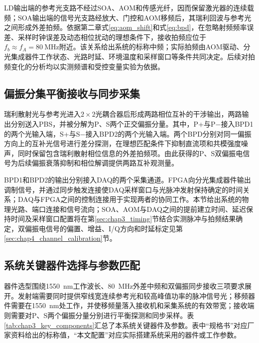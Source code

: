 LD输出端的参考光支路不经过SOA、AOM和传感光纤，因而保留激光器的连续载频；SOA输出端的信号光支路经放大、门控和AOM移频后，其瑞利回波与参考光之间形成外差拍频。依据第二章式\eqref{eq:aom_shift}和式\eqref{eq:bpd}，在忽略射频频率误差、采样时钟误差及动态相位扰动的理想条件下，接收拍频应位于$f_b\approx f_A=80~\mathrm{MHz}$附近。该关系给出系统的标称中频；实际拍频由AOM驱动、分光集成器件工作状态、光路时延、环境温度和采样窗口等条件共同决定。后续对拍频变化的分析均以实测频谱和受控变量实验为依据。

\subsection{偏振分集平衡接收与同步采集}

瑞利散射光与参考光进入$2\times2$光耦合器后形成两路相位互补的干涉输出，两路输出分别送入PBS，并被分解为P、S两个正交偏振分量。其中，P+与P$-$接入BPD1的两个光输入端，S+与S$-$接入BPD2的两个光输入端。两个BPD分别对同一偏振方向上的互补光信号进行差分探测，在理想匹配条件下抑制直流项和共模强度噪声，同时保留包含瑞利散射相位信息的外差拍频项。由此获得的P、S双偏振电信号为后续偏振衰落抑制和相位解调提供两路互补观测量。

BPD1和BPD2的输出分别接入DAQ的两个采集通道。FPGA向分光集成器件输出调制信号，并通过同步触发连接使DAQ采样窗口与光脉冲发射保持确定的时间关系；DAQ与FPGA之间的控制连接用于实现两者的协同工作。本节给出系统的物理光路、端口连接和信号流向；SOA、AOM与DAQ之间的提前建立时间、延迟保持时间及采样窗口配置将在第\ref{sec:chap3_timing}节结合实测脉冲与拍频结果确定，双偏振电信号的偏置、增益、I/Q方向和时延标定见第\ref{sec:chap4_channel_calibration}节。

\subsection{系统关键器件选择与参数匹配}
\label{sec:chap3_component_selection}

器件选型围绕1550~nm工作波长、80~MHz外差中频和双偏振同步接收三项要求展开。发射端需要同时提供窄线宽连续参考光和较高峰值功率的脉冲信号光；移频器件需要在1550~nm处工作，并使移频量落入接收机和采集系统的有效带宽；接收端则需要对P、S两个偏振分量分别进行平衡探测和同步采样。表\ref{tab:chap3_key_components}汇总了本系统关键器件及参数。表中“规格书”对应厂家资料给出的标称值，“本文配置”对应实际搭建系统采用的器件或工作参数。

